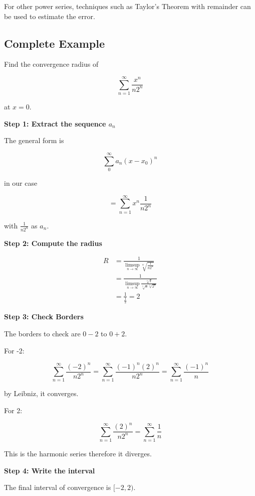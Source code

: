 For other power series, techniques such as Taylor's Theorem with remainder can be used to estimate the error.

\subsection{Complete Example}

Find the convergence radius of 

\[
    \sum_{n = 1}^{\infty} \frac{x^n}{n2^n} 
\]

at \(x = 0\).

\textbf{Step 1: Extract the sequence \(a_n\)}

The general form is 

\[
    \sum_{0}^{\infty} a_n (x - x_0)^n 
\]

in our case

\[
    = \sum_{n = 1}^{\infty} x^n \frac{1}{n2^n}
\]

with \(\frac{1}{n2^n}\) as \(a_n\).

\textbf{Step 2: Compute the radius}

\begin{align*}
     R &= \frac{1}{\limsup_{n \to \infty} \sqrt[n]{\frac{1}{n2^n}}} \\
      &= \frac{1}{\limsup_{n \to \infty}\frac{\sqrt[n]{1}}{\sqrt[n]{n} \sqrt[n]{2^n}}} \\
      &= \frac{1}{\frac{1}{2}} = 2
\end{align*}

\textbf{Step 3: Check Borders}

The borders to check are \( 0 - 2 \) to \( 0 + 2 \).

For -2:

\[
    \sum_{n = 1}^{\infty} \frac{(-2)^n}{n2^n} = \sum_{n = 1}^{\infty} \frac{(-1)^n (2)^n}{n2^n} 
    = \sum_{n = 1}^{\infty} \frac{(-1)^n}{n} 
\]

by Leibniz, it converges.

For 2:

\[
    \sum_{n = 1}^{\infty} \frac{(2)^n}{n2^n} = \sum_{n = 1}^{\infty} \frac{1}{n}
\]

This is the harmonic series therefore it diverges.

\textbf{Step 4: Write the interval}

The final interval of convergence is \([-2, 2)\).











